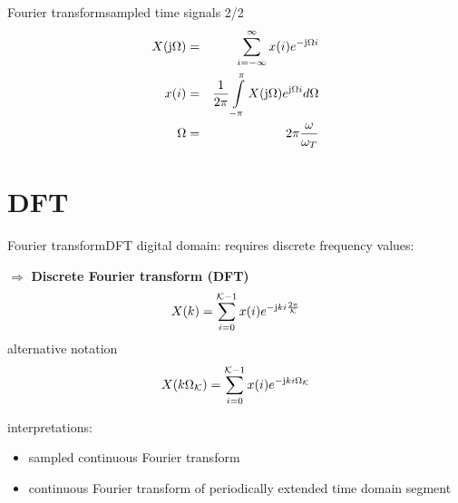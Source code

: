 	\begin{frame}{Fourier transform}{sampled time signals 2/2}
        \begin{eqnarray*}
            X(\mathrm{j}\Omega) &=& \sum\limits_{i=-\infty}^{\infty} x(i)e^{-\mathrm{j}\Omega i}\\
            x(i) &=& \frac{1}{2\pi}\int\limits_{-\pi}^{\pi}X(\mathrm{j}\Omega)e^{\mathrm{j}\Omega i} d\Omega\\
            \Omega &=& 2\pi\frac{\omega}{\omega_T}
        \end{eqnarray*}
	\end{frame}	


\section{DFT}
	\begin{frame}{Fourier transform}{DFT}
		digital domain: requires discrete frequency values:
		
		$\Rightarrow$ \textbf{Discrete Fourier transform (DFT)}
		\begin{equation*}
			X(k) = \sum\limits_{i=0}^{\mathcal{K}-1}{x(i){e}^{-\mathrm{j}ki\frac{2\pi}{\mathcal{K}}}}
		\end{equation*}
        \pause
        alternative notation
		\begin{equation*}
			X(k\Omega_\mathcal{K}) = \sum\limits_{i=0}^{\mathcal{K}-1}{x(i){e}^{-\mathrm{j}ki\Omega_\mathcal{K}}}
		\end{equation*}
		
		\pause
         interpretations:
		\begin{itemize}
			\item	sampled continuous Fourier transform
			\item	continuous Fourier transform of periodically extended time domain segment
		\end{itemize}
	\end{frame}	

